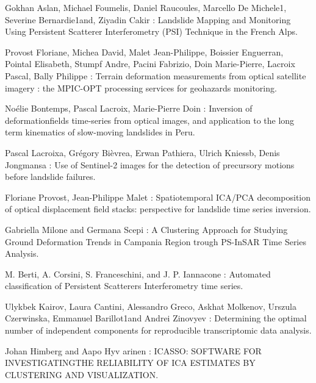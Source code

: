 \documentclass[11pt, openany]{report}
\begin{document}
\begin{thebibliography}{9} 
Gokhan Aslan, Michael Foumelis, Daniel Raucoules, Marcello De Michele1, Severine Bernardie1and, Ziyadin Cakir : Landslide Mapping and Monitoring Using Persistent Scatterer Interferometry (PSI) Technique in the French Alps.

Provost Floriane, Michea David, Malet Jean-Philippe, Boissier Enguerran, Pointal  Elisabeth, Stumpf Andre, Pacini  Fabrizio,  Doin Marie-Pierre, Lacroix Pascal, Bally Philippe : Terrain deformation measurements from optical satellite imagery : the MPIC-OPT processing services for geohazards monitoring.

Noélie Bontemps, Pascal Lacroix, Marie-Pierre Doin : Inversion of deformationfields time-series from optical images, and application to the long term kinematics of slow-moving landslides in Peru.

Pascal Lacroixa, Grégory Bièvrea, Erwan Pathiera, Ulrich Kniessb, Denis Jongmansa : Use of Sentinel-2 images for the detection of precursory motions before landslide failures.

Floriane Provost, Jean-Philippe Malet : Spatiotemporal ICA/PCA decomposition of optical displacement field stacks: perspective for landslide time series inversion.

Gabriella Milone and Germana Scepi : A Clustering Approach for Studying Ground Deformation Trends in Campania Region trough PS-InSAR Time Series Analysis.

M. Berti, A. Corsini, S. Franceschini, and J. P. Iannacone : Automated classification of Persistent Scatterers Interferometry time series.

Ulykbek Kairov, Laura Cantini, Alessandro Greco, Askhat Molkenov, Urszula Czerwinska, Emmanuel Barillot1and Andrei Zinovyev : Determining the optimal number of independent components for reproducible transcriptomic data analysis.

Johan Himberg and Aapo Hyv arinen : ICASSO: SOFTWARE FOR INVESTIGATINGTHE RELIABILITY OF ICA ESTIMATES BY CLUSTERING AND VISUALIZATION.

\end{thebibliography}


\end{document}
